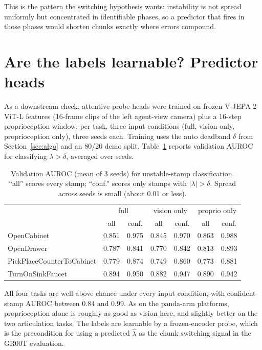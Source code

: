 \documentclass[11pt]{article}
\begin{document}
This is the pattern the switching hypothesis wants: instability is not spread
uniformly but concentrated in identifiable phases, so a predictor that fires in
those phases would shorten chunks exactly where errors compound.

\section{Are the labels learnable? Predictor heads}

As a downstream check, attentive-probe heads were trained on frozen V-JEPA 2
ViT-L features (16-frame clips of the left agent-view camera) plus a 16-step
proprioception window, per task, three input conditions (full, vision only,
proprioception only), three seeds each. Training uses the auto deadband
$\delta$ from Section~\ref{sec:algo} and an 80/20 demo split.
Table~\ref{tab:heads} reports validation AUROC for classifying
$\lambda > \delta$, averaged over seeds.

\begin{table}[h]
\centering
\small
\begin{tabular}{lcccccc}
\toprule
 & \multicolumn{2}{c}{full} & \multicolumn{2}{c}{vision only} & \multicolumn{2}{c}{proprio only} \\
 & all & conf. & all & conf. & all & conf. \\
\midrule
OpenCabinet & 0.851 & 0.975 & 0.845 & 0.970 & 0.863 & 0.988 \\
OpenDrawer & 0.787 & 0.841 & 0.770 & 0.842 & 0.813 & 0.893 \\
PickPlaceCounterToCabinet & 0.779 & 0.874 & 0.749 & 0.860 & 0.773 & 0.881 \\
TurnOnSinkFaucet & 0.894 & 0.950 & 0.882 & 0.947 & 0.890 & 0.942 \\
\bottomrule
\end{tabular}
\caption{Validation AUROC (mean of 3 seeds) for unstable-stamp classification.
``all'' scores every stamp; ``conf.'' scores only stamps with
$|\lambda| > \delta$. Spread across seeds is small (about 0.01 or less).}
\label{tab:heads}
\end{table}

All four tasks are well above chance under every input condition, with
confident-stamp AUROC between 0.84 and 0.99. As on the panda-arm platforms,
proprioception alone is roughly as good as vision here, and slightly better on
the two articulation tasks. The labels are learnable by a frozen-encoder probe,
which is the precondition for using a predicted $\hat\lambda$ as the chunk
switching signal in the GR00T evaluation.
\end{document}
